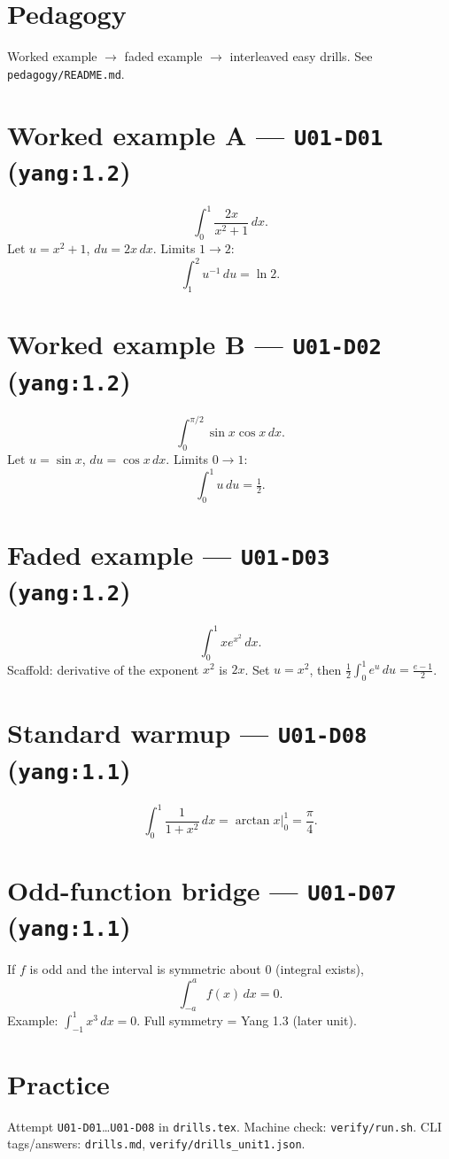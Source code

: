 \section{Pedagogy}
Worked example \(\to\) faded example \(\to\) interleaved easy drills. See \texttt{pedagogy/README.md}.

\section{Worked example A --- \texttt{U01-D01} (\texttt{yang:1.2})}
\[
\int_0^1 \frac{2x}{x^2+1}\,dx.
\]
Let \(u=x^2+1\), \(du=2x\,dx\). Limits \(1\to 2\):
\[
\int_1^2 u^{-1}\,du=\ln 2.
\]

\section{Worked example B --- \texttt{U01-D02} (\texttt{yang:1.2})}
\[
\int_0^{\pi/2}\sin x\cos x\,dx.
\]
Let \(u=\sin x\), \(du=\cos x\,dx\). Limits \(0\to 1\):
\[
\int_0^1 u\,du=\tfrac12.
\]

\section{Faded example --- \texttt{U01-D03} (\texttt{yang:1.2})}
\[
\int_0^1 x e^{x^2}\,dx.
\]
Scaffold: derivative of the exponent \(x^2\) is \(2x\). Set \(u=x^2\), then
\(\frac12\int_0^1 e^u\,du=\frac{e-1}{2}\).

\section{Standard warmup --- \texttt{U01-D08} (\texttt{yang:1.1})}
\[
\int_0^1\frac{1}{1+x^2}\,dx=\arctan x\Big|_0^1=\frac\pi4.
\]

\section{Odd-function bridge --- \texttt{U01-D07} (\texttt{yang:1.1})}
If \(f\) is odd and the interval is symmetric about 0 (integral exists),
\[
\int_{-a}^{a}f(x)\,dx=0.
\]
Example: \(\int_{-1}^{1}x^3\,dx=0\). Full symmetry = Yang 1.3 (later unit).

\section{Practice}
Attempt \texttt{U01-D01}\ldots\texttt{U01-D08} in \texttt{drills.tex}.
Machine check: \texttt{verify/run.sh}. CLI tags/answers: \texttt{drills.md}, \texttt{verify/drills\_unit1.json}.

